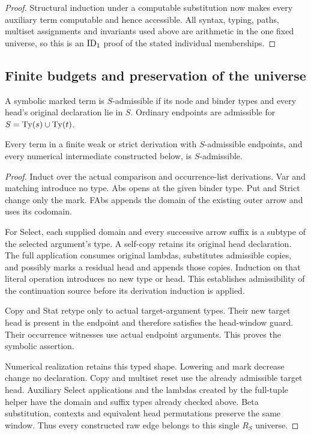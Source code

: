 \begin{proof}
Structural induction under a computable substitution now makes every
auxiliary term computable and hence accessible. All syntax, typing,
paths, multiset assignments and invariants used above are arithmetic
in the one fixed universe, so this is an $\mathrm{ID}_1$ proof of the stated
individual memberships.
\end{proof}

\subsection{Finite budgets and preservation of the universe}
A symbolic marked term is $S$-admissible if its node and binder types
and every head's original declaration lie in $S$. Ordinary endpoints
are admissible for $S=\operatorname{Ty}(s)\cup\operatorname{Ty}(t)$.

\begin{lemma}[Locality]\label{lem:window-locality}
Every term in a finite weak or strict derivation with $S$-admissible
endpoints, and every numerical intermediate constructed below, is
$S$-admissible.
\end{lemma}
\begin{proof}
Induct over the actual comparison and occurrence-list derivations.
Var and matching introduce no type. Abs opens at the given binder
type. Put and Strict change only the mark. FAbs appends the domain
of the existing outer arrow and uses its codomain.

For Select, each supplied domain and every successive arrow suffix is
a subtype of the selected argument's type. A self-copy retains its
original head declaration. The full application consumes original
lambdas, substitutes admissible copies, and possibly marks a residual
head and appends those copies. Induction on that literal operation
introduces no new type or head. This establishes admissibility of the
continuation source before its derivation induction is applied.

Copy and Stat retype only to actual target-argument types. Their new
target head is present in the endpoint and therefore satisfies the
head-window guard. Their occurrence witnesses use actual endpoint
arguments. This proves the symbolic assertion.

Numerical realization retains this typed shape. Lowering and mark
decrease change no declaration. Copy and multiset reset use the
already admissible target head. Auxiliary Select applications and the
lambdas created by the full-tuple helper have the domain and suffix
types already checked above. Beta substitution, contexts and equivalent
head permutations preserve the same window. Thus every constructed
raw edge belongs to this single $R_S$ universe.
\end{proof}

